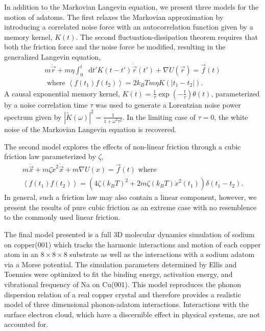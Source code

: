 \documentclass[7pt]{article}
\newcommand*{\diff}{\mathop{}\!\mathrm{d}}
\begin{document}
In addition to the Markovian Langevin equation, we present three models for the motion of adatoms. The first relaxes the Markovian approximation by introducing a correlated noise force with an autocorrelation function given by a memory kernel, $K(t)$. The second fluctuation-dissipation theorem requires that both the friction force and the noise force be modified, resulting in the generalized Langevin equation\cite{Kubo},
\begin{equation}
\begin{gathered}
	m\ddot{\vec{r}}+m\eta\int_0^t\diff{t'}K(t-t')\dot{\vec{r}}(t')+\nabla U(\vec{r})=\vec{f}(t) \\
	\text{ where } \left<f(t_1)f(t_2)\right>=2k_BTm\eta K(\left|t_1-t_2\right|).
\end{gathered}
	\label{eq:gle}
\end{equation}
A causal exponential memory kernel, $K(t)=\frac{1}{\tau}\exp\left(-\frac{t}{\tau}\right)\theta(t)$, parameterized by a noise correlation time $\tau$ was used to generate a Lorentzian noise power spectrum given by $\left|\tilde{K}(\omega)\right|^2=\frac{1}{1+\omega^2\tau^2}$. In the limiting case of $\tau=0$, the white noise of the Markovian Langevin equation is recovered. 

The second model explores the effects of non-linear friction through a cubic friction law parameterized by $\zeta$\cite{Kramers},
\begin{equation}
\begin{gathered}
	m\ddot{\vec{x}} + m\zeta\dot{x}^2\dot{\vec{x}} + m \nabla U(x) = \vec{f}(t) \text{ where } \\
	\left<f(t_1)f(t_2)\right>=\left(4\zeta\left(k_BT\right)^2 + 2 m \zeta \left(k_BT\right)\dot{x}^2(t_1)\right)\delta\left(t_1-t_2\right). 
\end{gathered}
\end{equation}
In general, such a friction law may also contain a linear component, however, we present the results of pure cubic friction as an extreme case with no resemblence to the commonly used linear friction. 


The final model presented is a full 3D molecular dynamics simulation of sodium on copper(001) which tracks the harmonic interactions and motion of each copper atom in an $8\times8\times8$ substrate as well as the interactions with a sodium adatom via a Morse potential. The simulation parameters determined by Ellis and Toennies were optimized to fit the binding energy, activation energy, and vibrational frequency of Na on Cu(001)\cite{Ellis}. This model reproduces the phonon dispersion relation of a real copper crystal\cite{Sinha} and therefore provides a realistic model of three dimensional phonon-adatom interactions. Interactions with the surface electron cloud, which have a discernible effect in physical systems\cite{Rittmeyer2016}, are not accounted for.
\end{document}
